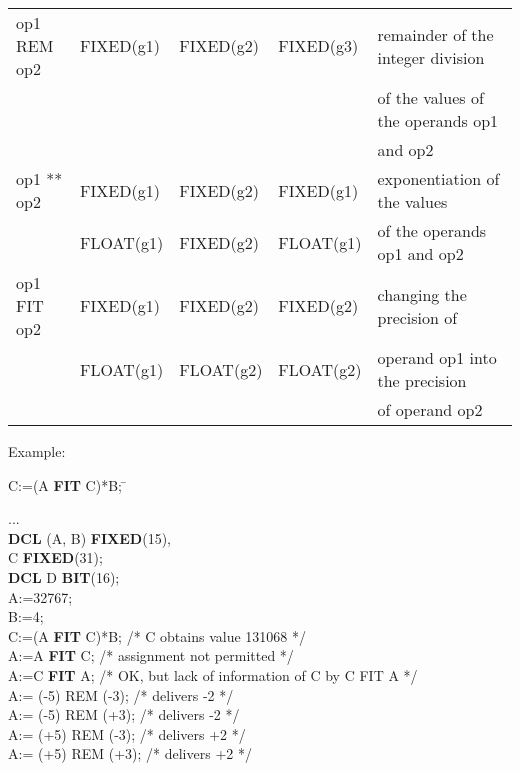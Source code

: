 \begin{table}
\begin{center}
\begin{tabular}{|l|l|l|l|l|}
op1 REM op2      & FIXED(g1)       & FIXED(g2)       & FIXED(g3)         & remainder of the integer division\\
                 &                 &                 &                   & of the values of the operands op1\\
                 &                 &                 &                   & and op2\\ \hline

op1 ** op2       & FIXED(g1)       & FIXED(g2)       & FIXED(g1)         & exponentiation of the values\\
                 & FLOAT(g1)       & FIXED(g2)       & FLOAT(g1)         & of the operands op1 and op2\\ \hline

op1 FIT op2      & FIXED(g1)       & FIXED(g2)       & FIXED(g2)         & changing the precision of\\
                 & FLOAT(g1)       & FLOAT(g2)       & FLOAT(g2)         & operand op1 into the precision\\
                 &                 &                 &                   & of operand op2\\  
\hline
\end{tabular}
\end{center}
\end{table}

Example:

\begin{modified}
\begin{tabbing}
C:=(A {\bf FIT} C)*B; \x \x \= \kill

... \> \\
{\bf DCL} (A, B) {\bf FIXED}(15), \> \\
\x        C {\bf FIXED}(31);      \> \\
{\bf DCL} D {\bf BIT}(16);        \> \\
A:=32767;                         \> \\
B:=4;                             \> \\
C:=(A {\bf FIT} C)*B;    \> /* C obtains value 131068 */ \\
A:=A {\bf FIT} C;        \> /* assignment not permitted */ \\
A:=C {\bf FIT} A;        \> /* OK, but lack of information of C by C FIT A */ \\
A:= (-5) REM (-3);	 \> /* delivers -2 */ \\
A:= (-5) REM (+3);	 \> /* delivers -2 */ \\
A:= (+5) REM (-3);	 \> /* delivers +2 */ \\
A:= (+5) REM (+3);	 \> /* delivers +2 */ \\
\end{tabbing}
\end{modified}

